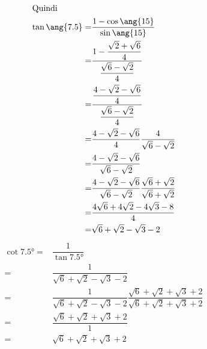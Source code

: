 \begin{align*}
	\intertext{Quindi}
	\tan\ang{7.5}=&\dfrac{1-\cos\ang{15}}{\sin\ang{15}}\\
	=&\dfrac{1-\dfrac{\sqrt{2}+\sqrt{6}}{4}}{\dfrac{\sqrt{6}-\sqrt{2}}{4}}\\
	=&\dfrac{\dfrac{4-\sqrt{2}-\sqrt{6}}{4}}{\dfrac{\sqrt{6}-\sqrt{2}}{4}}\\
	=&\dfrac{4-\sqrt{2}-\sqrt{6}}{4}\dfrac{4}{\sqrt{6}-\sqrt{2}}\\
	=&\dfrac{4-\sqrt{2}-\sqrt{6}}{\sqrt{6}-\sqrt{2}}\\
	=&\dfrac{4-\sqrt{2}-\sqrt{6}}{\sqrt{6}-\sqrt{2}}\dfrac{\sqrt{6}+\sqrt{2}}{\sqrt{6}+\sqrt{2}}\\
	=&\dfrac{4\sqrt{6}+4\sqrt{2}-4\sqrt{3}-8}{4}\\
	=&\sqrt{6}+\sqrt{2}-\sqrt{3}-2
\end{align*}
\begin{align*}
	\cot\ang{7.5}=&\dfrac{1}{\tan\ang{7.5}}\\
	=&\dfrac{1}{\sqrt{6}+\sqrt{2}-\sqrt{3}-2}\\
	=&\dfrac{1}{\sqrt{6}+\sqrt{2}-\sqrt{3}-2}\dfrac{\sqrt{6}+\sqrt{2}+\sqrt{3}+2}{\sqrt{6}+\sqrt{2}+\sqrt{3}+2}\\
	=&\dfrac{\sqrt{6}+\sqrt{2}+\sqrt{3}+2}{1}\\
	=&\sqrt{6}+\sqrt{2}+\sqrt{3}+2\\
\end{align*}
